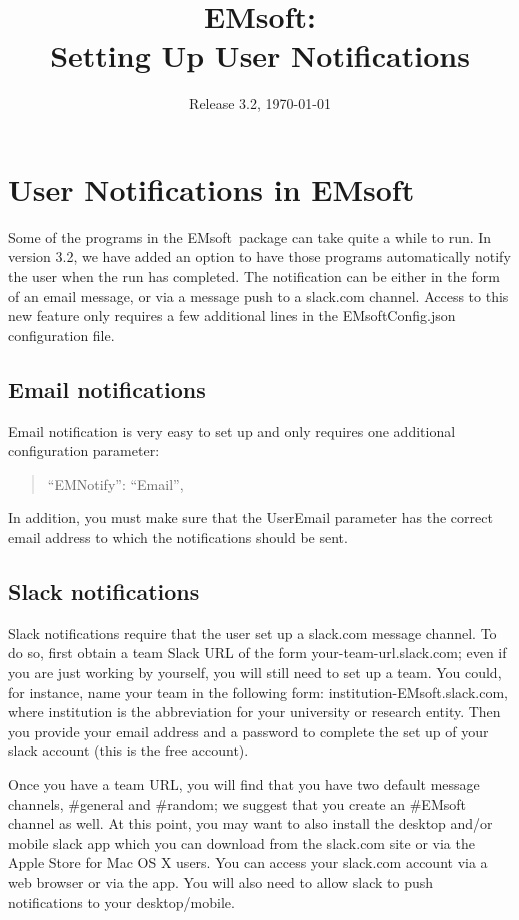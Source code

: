 \documentclass[DIV=calc, paper=letter, fontsize=11pt]{scrartcl}	 %
\title{EMsoft:\\ Setting Up User Notifications} %
\author{\vspace*{-0.7in}} %
\date{Release 3.2, \today}
\newcommand{\ctp}{\textsf{EMsoft}}
\begin{document}
\maketitle

\renewcommand{\contentsname}{Table of Contents}
{\small\tableofcontents}

\newpage
\section{User Notifications in \ctp}
Some of the programs in the \ctp\ package can take quite a while to run.  In version 3.2, we have added an option to have those programs automatically notify
the user when the run has completed.  The notification can be either in the form of an email message, or via a message push to a slack.com channel.  Access
to this new feature only requires a few additional lines in the \textsf{EMsoftConfig.json} configuration file.

\subsection{Email notifications}
Email notification is very easy to set up and only requires one additional configuration parameter:
\begin{verse}
	{\color{blue} ``EMNotify'': ``Email''},
\end{verse}
In addition, you must make sure that the \textsf{UserEmail} parameter has the correct email address to which the notifications should be sent.

\subsection{Slack notifications}
Slack notifications require that the user set up a slack.com message channel.  To do so, first obtain a team Slack URL of the form \textsf{your-team-url.slack.com};
even if you are just working by yourself, you will still need to set up a team.  You could, for instance, name your team in the following form: \textsf{institution-EMsoft.slack.com},
where \textsf{institution} is the abbreviation for your university or research entity.   Then you provide your email address and a password to complete the set up
of your slack account (this is the free account). 

Once you have a team URL, you will find that you have two default message channels, \textsf{\#general} and \textsf{\#random}; we suggest that you create an \textsf{\#EMsoft}
channel as well.  At this point, you may want to also install the desktop and/or mobile slack app which you can download from the slack.com site or via the Apple Store for Mac OS X
users.  You can access your slack.com account via a web browser or via the app.  You will also need to allow slack to push notifications to your desktop/mobile.
\end{document}
